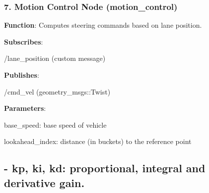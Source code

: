 \subsubsection*{7. Motion Control Node ({\ttfamily motion\+\_\+control})}

{\bfseries Function}\+: Computes steering commands based on lane position.
\begin{DoxyItemize}
\item {\bfseries Subscribes}\+:
\begin{DoxyItemize}
\item {\ttfamily /lane\+\_\+position} (custom message)
\end{DoxyItemize}
\item {\bfseries Publishes}\+:
\begin{DoxyItemize}
\item {\ttfamily /cmd\+\_\+vel} (geometry\+\_\+msgs\+::\+Twist)
\end{DoxyItemize}
\item {\bfseries Parameters}\+:
\begin{DoxyItemize}
\item {\ttfamily base\+\_\+speed}\+: base speed of vehicle
\item {\ttfamily lookahead\+\_\+index}\+: distance (in buckets) to the reference point \subsection*{-\/ {\ttfamily kp}, {\ttfamily ki}, {\ttfamily kd}\+: proportional, integral and derivative gain. }
\end{DoxyItemize}
\end{DoxyItemize}